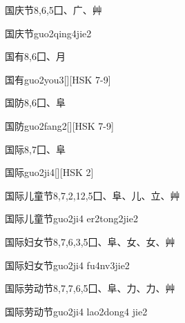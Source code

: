 \begin{Entry}{国庆节}{8,6,5}{⼞、⼴、⾋}
  \begin{Phonetics}{国庆节}{guo2qing4jie2}
  \end{Phonetics}
\end{Entry}

\begin{Entry}{国有}{8,6}{⼞、⽉}
  \begin{Phonetics}{国有}{guo2you3}[][HSK 7-9]
  \end{Phonetics}
\end{Entry}

\begin{Entry}{国防}{8,6}{⼞、⾩}
  \begin{Phonetics}{国防}{guo2fang2}[][HSK 7-9]
  \end{Phonetics}
\end{Entry}

\begin{Entry}{国际}{8,7}{⼞、⾩}
  \begin{Phonetics}{国际}{guo2ji4}[][HSK 2]
  \end{Phonetics}
\end{Entry}

\begin{Entry}{国际儿童节}{8,7,2,12,5}{⼞、⾩、⼉、⽴、⾋}
  \begin{Phonetics}{国际儿童节}{guo2ji4 er2tong2jie2}
  \end{Phonetics}
\end{Entry}

\begin{Entry}{国际妇女节}{8,7,6,3,5}{⼞、⾩、⼥、⼥、⾋}
  \begin{Phonetics}{国际妇女节}{guo2ji4 fu4nv3jie2}
  \end{Phonetics}
\end{Entry}

\begin{Entry}{国际劳动节}{8,7,7,6,5}{⼞、⾩、⼒、⼒、⾋}
  \begin{Phonetics}{国际劳动节}{guo2ji4 lao2dong4 jie2}
  \end{Phonetics}
\end{Entry}

